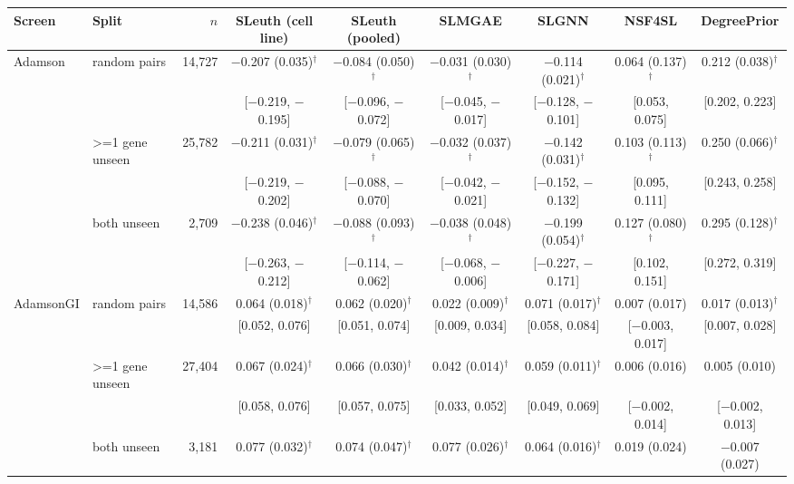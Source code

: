 \begin{tabular}{llr|cccccc}
\hline
Screen & Split & $n$ & SLeuth (cell line) & SLeuth (pooled) & SLMGAE & SLGNN & NSF4SL & DegreePrior \\
\hline
Adamson & random pairs & 14,727 & $-$0.207 (0.035)$^\dagger$ & $-$0.084 (0.050)$^\dagger$ & $-$0.031 (0.030)$^\dagger$ & $-$0.114 (0.021)$^\dagger$ & 0.064 (0.137)$^\dagger$ & 0.212 (0.038)$^\dagger$ \\
 & & & \scriptsize[$-$0.219, $-$0.195] & \scriptsize[$-$0.096, $-$0.072] & \scriptsize[$-$0.045, $-$0.017] & \scriptsize[$-$0.128, $-$0.101] & \scriptsize[0.053, 0.075] & \scriptsize[0.202, 0.223] \\
 & >=1 gene unseen & 25,782 & $-$0.211 (0.031)$^\dagger$ & $-$0.079 (0.065)$^\dagger$ & $-$0.032 (0.037)$^\dagger$ & $-$0.142 (0.031)$^\dagger$ & 0.103 (0.113)$^\dagger$ & 0.250 (0.066)$^\dagger$ \\
 & & & \scriptsize[$-$0.219, $-$0.202] & \scriptsize[$-$0.088, $-$0.070] & \scriptsize[$-$0.042, $-$0.021] & \scriptsize[$-$0.152, $-$0.132] & \scriptsize[0.095, 0.111] & \scriptsize[0.243, 0.258] \\
 & both unseen & 2,709 & $-$0.238 (0.046)$^\dagger$ & $-$0.088 (0.093)$^\dagger$ & $-$0.038 (0.048)$^\dagger$ & $-$0.199 (0.054)$^\dagger$ & 0.127 (0.080)$^\dagger$ & 0.295 (0.128)$^\dagger$ \\
 & & & \scriptsize[$-$0.263, $-$0.212] & \scriptsize[$-$0.114, $-$0.062] & \scriptsize[$-$0.068, $-$0.006] & \scriptsize[$-$0.227, $-$0.171] & \scriptsize[0.102, 0.151] & \scriptsize[0.272, 0.319] \\
\hline
AdamsonGI & random pairs & 14,586 & 0.064 (0.018)$^\dagger$ & 0.062 (0.020)$^\dagger$ & 0.022 (0.009)$^\dagger$ & 0.071 (0.017)$^\dagger$ & 0.007 (0.017) & 0.017 (0.013)$^\dagger$ \\
 & & & \scriptsize[0.052, 0.076] & \scriptsize[0.051, 0.074] & \scriptsize[0.009, 0.034] & \scriptsize[0.058, 0.084] & \scriptsize[$-$0.003, 0.017] & \scriptsize[0.007, 0.028] \\
 & >=1 gene unseen & 27,404 & 0.067 (0.024)$^\dagger$ & 0.066 (0.030)$^\dagger$ & 0.042 (0.014)$^\dagger$ & 0.059 (0.011)$^\dagger$ & 0.006 (0.016) & 0.005 (0.010) \\
 & & & \scriptsize[0.058, 0.076] & \scriptsize[0.057, 0.075] & \scriptsize[0.033, 0.052] & \scriptsize[0.049, 0.069] & \scriptsize[$-$0.002, 0.014] & \scriptsize[$-$0.002, 0.013] \\
 & both unseen & 3,181 & 0.077 (0.032)$^\dagger$ & 0.074 (0.047)$^\dagger$ & 0.077 (0.026)$^\dagger$ & 0.064 (0.016)$^\dagger$ & 0.019 (0.024) & $-$0.007 (0.027) \\

\end{tabular}
